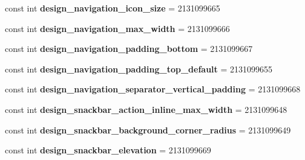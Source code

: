 \begin{DoxyCompactItemize}
\item 
\hypertarget{classClient_1_1Droid_1_1Resource_1_1Dimension_a5d8b564d73fa1da365d44fff80f29349}{}const int {\bfseries design\+\_\+navigation\+\_\+icon\+\_\+size} = 2131099665\label{classClient_1_1Droid_1_1Resource_1_1Dimension_a5d8b564d73fa1da365d44fff80f29349}

\item 
\hypertarget{classClient_1_1Droid_1_1Resource_1_1Dimension_a71ee4f3b37ff7b5eaba392533ab12c27}{}const int {\bfseries design\+\_\+navigation\+\_\+max\+\_\+width} = 2131099666\label{classClient_1_1Droid_1_1Resource_1_1Dimension_a71ee4f3b37ff7b5eaba392533ab12c27}

\item 
\hypertarget{classClient_1_1Droid_1_1Resource_1_1Dimension_a890c620c99ed1b1d6ea848e23de9b86a}{}const int {\bfseries design\+\_\+navigation\+\_\+padding\+\_\+bottom} = 2131099667\label{classClient_1_1Droid_1_1Resource_1_1Dimension_a890c620c99ed1b1d6ea848e23de9b86a}

\item 
\hypertarget{classClient_1_1Droid_1_1Resource_1_1Dimension_a67f6685f1f5e39aed130d4cb5d11bd93}{}const int {\bfseries design\+\_\+navigation\+\_\+padding\+\_\+top\+\_\+default} = 2131099655\label{classClient_1_1Droid_1_1Resource_1_1Dimension_a67f6685f1f5e39aed130d4cb5d11bd93}

\item 
\hypertarget{classClient_1_1Droid_1_1Resource_1_1Dimension_a765f5265f7c85daed1ee21c643d5929e}{}const int {\bfseries design\+\_\+navigation\+\_\+separator\+\_\+vertical\+\_\+padding} = 2131099668\label{classClient_1_1Droid_1_1Resource_1_1Dimension_a765f5265f7c85daed1ee21c643d5929e}

\item 
\hypertarget{classClient_1_1Droid_1_1Resource_1_1Dimension_ae4e527e87ce1ae649967132717e6bb6a}{}const int {\bfseries design\+\_\+snackbar\+\_\+action\+\_\+inline\+\_\+max\+\_\+width} = 2131099648\label{classClient_1_1Droid_1_1Resource_1_1Dimension_ae4e527e87ce1ae649967132717e6bb6a}

\item 
\hypertarget{classClient_1_1Droid_1_1Resource_1_1Dimension_a6751aceeefe1aeb5daba36cda7d66bd1}{}const int {\bfseries design\+\_\+snackbar\+\_\+background\+\_\+corner\+\_\+radius} = 2131099649\label{classClient_1_1Droid_1_1Resource_1_1Dimension_a6751aceeefe1aeb5daba36cda7d66bd1}

\item 
\hypertarget{classClient_1_1Droid_1_1Resource_1_1Dimension_a564fa138cfa3deba6f22c61ea60bdfa9}{}const int {\bfseries design\+\_\+snackbar\+\_\+elevation} = 2131099669\label{classClient_1_1Droid_1_1Resource_1_1Dimension_a564fa138cfa3deba6f22c61ea60bdfa9}


\end{DoxyCompactItemize}
